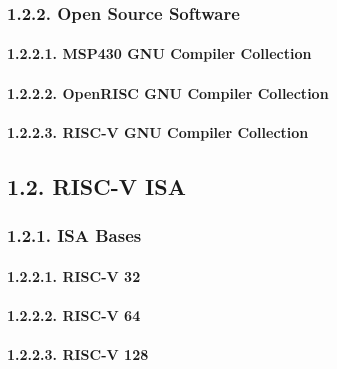 \documentclass[]{article}
\let\oldparagraph\paragraph
\renewcommand{\paragraph}[1]{\oldparagraph{#1}\mbox{}}
\begin{document}
\hypertarget{open-source-software}{%
\subsubsection{1.2.2. Open Source Software}\label{open-source-software}}

\hypertarget{msp430-gnu-compiler-collection}{%
\paragraph{1.2.2.1. MSP430 GNU Compiler
Collection}\label{msp430-gnu-compiler-collection}}

\hypertarget{openrisc-gnu-compiler-collection}{%
\paragraph{1.2.2.2. OpenRISC GNU Compiler
Collection}\label{openrisc-gnu-compiler-collection}}

\hypertarget{risc-v-gnu-compiler-collection}{%
\paragraph{1.2.2.3. RISC-V GNU Compiler
Collection}\label{risc-v-gnu-compiler-collection}}

\hypertarget{risc-v-isa}{%
\subsection{1.2. RISC-V ISA}\label{risc-v-isa}}

\hypertarget{isa-bases}{%
\subsubsection{1.2.1. ISA Bases}\label{isa-bases}}

\hypertarget{risc-v-32}{%
\paragraph{1.2.2.1. RISC-V 32}\label{risc-v-32}}

\hypertarget{risc-v-64}{%
\paragraph{1.2.2.2. RISC-V 64}\label{risc-v-64}}

\hypertarget{risc-v-128}{%
\paragraph{1.2.2.3. RISC-V 128}\label{risc-v-128}}
\end{document}
